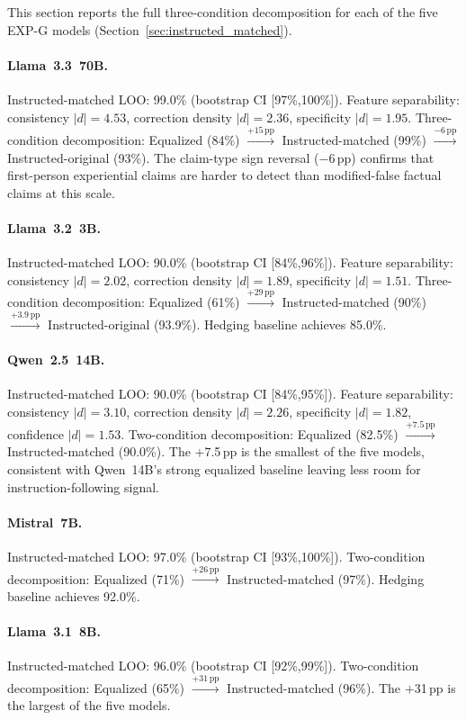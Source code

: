 This section reports the full three-condition decomposition for each of the five EXP-G models (Section~\ref{sec:instructed_matched}).

\paragraph{Llama~3.3~70B.}
Instructed-matched LOO: 99.0\% (bootstrap CI [97\%,100\%]). Feature separability: consistency $|d|=4.53$, correction density $|d|=2.36$, specificity $|d|=1.95$. Three-condition decomposition: Equalized (84\%) $\xrightarrow{+15\,\text{pp}}$ Instructed-matched (99\%) $\xrightarrow{-6\,\text{pp}}$ Instructed-original (93\%). The claim-type sign reversal ($-$6\,pp) confirms that first-person experiential claims are harder to detect than modified-false factual claims at this scale.

\paragraph{Llama~3.2~3B.}
Instructed-matched LOO: 90.0\% (bootstrap CI [84\%,96\%]). Feature separability: consistency $|d|=2.02$, correction density $|d|=1.89$, specificity $|d|=1.51$. Three-condition decomposition: Equalized (61\%) $\xrightarrow{+29\,\text{pp}}$ Instructed-matched (90\%) $\xrightarrow{+3.9\,\text{pp}}$ Instructed-original (93.9\%). Hedging baseline achieves 85.0\%.

\paragraph{Qwen~2.5~14B.}
Instructed-matched LOO: 90.0\% (bootstrap CI [84\%,95\%]). Feature separability: consistency $|d|=3.10$, correction density $|d|=2.26$, specificity $|d|=1.82$, confidence $|d|=1.53$. Two-condition decomposition: Equalized (82.5\%) $\xrightarrow{+7.5\,\text{pp}}$ Instructed-matched (90.0\%). The $+$7.5\,pp is the smallest of the five models, consistent with Qwen~14B's strong equalized baseline leaving less room for instruction-following signal.

\paragraph{Mistral~7B.}
Instructed-matched LOO: 97.0\% (bootstrap CI [93\%,100\%]). Two-condition decomposition: Equalized (71\%) $\xrightarrow{+26\,\text{pp}}$ Instructed-matched (97\%). Hedging baseline achieves 92.0\%.

\paragraph{Llama~3.1~8B.}
Instructed-matched LOO: 96.0\% (bootstrap CI [92\%,99\%]). Two-condition decomposition: Equalized (65\%) $\xrightarrow{+31\,\text{pp}}$ Instructed-matched (96\%). The $+$31\,pp is the largest of the five models.

